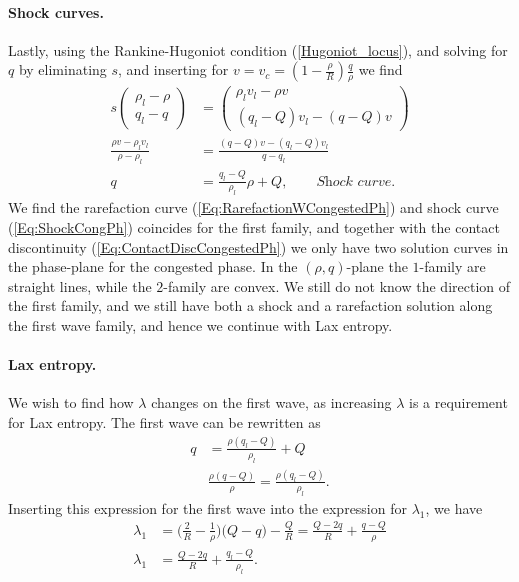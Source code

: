 \documentclass[10pt]{article}
\numberwithin{equation}{section}
\begin{document}
\paragraph{Shock curves.}
Lastly, using the Rankine-Hugoniot condition (\ref{Hugoniot_locus}), and solving for $q$ by eliminating $s$, and inserting for $v = v_c = (1- \frac{\rho}{R})\frac{q}{\rho}$ we find
\begin{align}
     s \begin{pmatrix} \rho_l - \rho \\ q_l - q \end{pmatrix} &= \begin{pmatrix} \rho_l v_l - \rho v \\ (q_l - Q)v_l - (q - Q)v \end{pmatrix} \nonumber\\
     \frac{\rho v - \rho_l v_l}{\rho - \rho_l} &= \frac{(q-Q)v - (q_l-Q)v_l}{q - q_l} \nonumber\\
      q &= \frac{q_l - Q}{\rho_l} \rho + Q,  \quad \quad \textit{Shock curve.}
     \label{Eq:ShockCongPh}
\end{align}
We find the rarefaction curve (\ref{Eq:RarefactionWCongestedPh}) and shock curve (\ref{Eq:ShockCongPh}) coincides for the first family, and together with the contact discontinuity (\ref{Eq:ContactDiscCongestedPh}) we only have two solution curves in the phase-plane for the congested phase. In the $(\rho,q)$-plane the $1$-family are straight lines, while the $2$-family are convex.
We still do not know the direction of the first family, and we still have both a shock and a rarefaction solution along the first wave family, and hence we continue with Lax entropy. 

\paragraph{Lax entropy.}
We wish to find how $\lambda$ changes on the first wave, as increasing $\lambda$ is a requirement for Lax entropy. The first wave can be rewritten as 
\begin{align*}
q &=  \frac{\rho( q_l - Q)}{\rho_l} + Q \\
 & \frac{\rho( q - Q)}{\rho}  =  \frac{\rho( q_l - Q)}{\rho_l}.
\end{align*}
Inserting this expression for the first wave into the expression for $\lambda_1$, we have
\begin{align}
     \lambda_1 &= \big ( \frac{2}{R} - \frac{1}{\rho} )\big (Q- q) - \frac{Q}{R} 
     = \frac{Q - 2q}{R} + \frac{q-Q}{\rho} \nonumber \\
     \lambda_1 &= \frac{Q - 2q}{R} + \frac{q_l-Q}{\rho_l}.
     \label{Eq:DirectionOfLambda}
\end{align}
\end{document}
